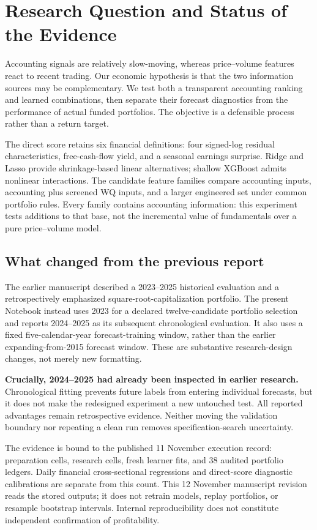 \documentclass[11pt]{article}
\begin{document}
\section{Research Question and Status of the Evidence}
Accounting signals are relatively slow-moving, whereas price--volume features react to recent trading. Our economic hypothesis is that the two information sources may be complementary. We test both a transparent accounting ranking and learned combinations, then separate their forecast diagnostics from the performance of actual funded portfolios. The objective is a defensible process rather than a return target.

The direct score retains six financial definitions: four signed-log residual characteristics, free-cash-flow yield, and a seasonal earnings surprise. Ridge and Lasso provide shrinkage-based linear alternatives; shallow XGBoost admits nonlinear interactions. The candidate feature families compare accounting inputs, accounting plus screened WQ inputs, and a larger engineered set under common portfolio rules. Every family contains accounting information: this experiment tests additions to that base, not the incremental value of fundamentals over a pure price--volume model.

\subsection{What changed from the previous report}
The earlier manuscript described a 2023--2025 historical evaluation and a retrospectively emphasized square-root-capitalization portfolio. The present Notebook instead uses 2023 for a declared twelve-candidate portfolio selection and reports 2024--2025 as its subsequent chronological evaluation. It also uses a fixed five-calendar-year forecast-training window, rather than the earlier expanding-from-2015 forecast window. These are substantive research-design changes, not merely new formatting.

\textbf{Crucially, 2024--2025 had already been inspected in earlier research.} Chronological fitting prevents future labels from entering individual forecasts, but it does not make the redesigned experiment a new untouched test. All reported advantages remain retrospective evidence. Neither moving the validation boundary nor repeating a clean run removes specification-search uncertainty.

The evidence is bound to the published 11 November execution record: \DataCodeCells{} preparation cells, \CodeCells{} research cells, \FitCount{} fresh learner fits, and 38 audited portfolio ledgers. Daily financial cross-sectional regressions and direct-score diagnostic calibrations are separate from this count. This 12 November manuscript revision reads the stored outputs; it does not retrain models, replay portfolios, or resample bootstrap intervals. Internal reproducibility does not constitute independent confirmation of profitability.
\clearpage
\end{document}
